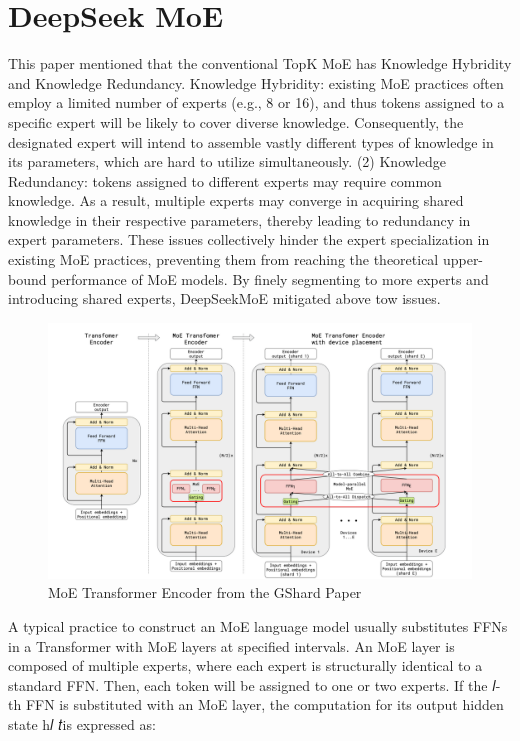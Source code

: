 \section{DeepSeek MoE}

This paper mentioned that the conventional TopK MoE has Knowledge Hybridity and Knowledge Redundancy. Knowledge Hybridity: existing MoE practices often employ a limited number of experts (e.g., 8 or 16), and thus tokens assigned to a specific expert will be likely to cover diverse knowledge. Consequently, the designated expert will intend to assemble vastly different types of knowledge in its parameters, which are hard to utilize simultaneously. (2) Knowledge Redundancy: tokens assigned to different experts may require common knowledge. As a result, multiple experts may converge in acquiring shared knowledge in their respective parameters, thereby leading to redundancy in expert parameters. These issues collectively hinder the expert specialization in existing MoE practices, preventing them from reaching the theoretical upper-bound performance of MoE models. By finely segmenting to more experts and introducing shared experts, DeepSeekMoE mitigated above tow issues.


\begin{figure}[t]
	\centering
	\includegraphics[scale=0.35]{./images/transformer/moe_block.png}
	\caption{MoE Transformer Encoder from the GShard Paper}
\end{figure}
A typical practice to construct an MoE language model usually substitutes FFNs in a Transformer with MoE layers at specified intervals. An MoE layer is composed of multiple experts, where each expert is structurally identical to a standard FFN. Then, each token will be assigned to one or two experts. If the 𝑙-th FFN is substituted with an MoE layer, the computation for its output hidden state h𝑙 𝑡is expressed as:


